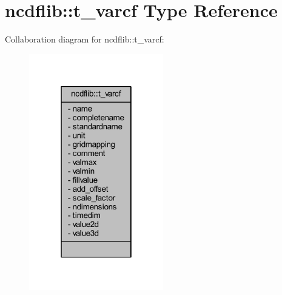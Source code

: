 \hypertarget{structncdflib_1_1t__varcf}{}\section{ncdflib\+:\+:t\+\_\+varcf Type Reference}
\label{structncdflib_1_1t__varcf}


Collaboration diagram for ncdflib\+:\+:t\+\_\+varcf\+:\nopagebreak
\begin{figure}[H]
\begin{center}
\leavevmode
\includegraphics[width=166pt]{structncdflib_1_1t__varcf__coll__graph}
\end{center}
\end{figure}
